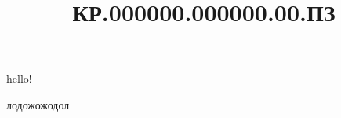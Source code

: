 \documentclass{kurreport}
\title{КР.000000.000000.00.ПЗ}
\begin{document}

\setcounter{page}{2}

\lipsum[1-20]
\newpage
\BGfrom{\thepage}
hello!

лодожожодол

\lipsum[1-1500]
\end{document}
